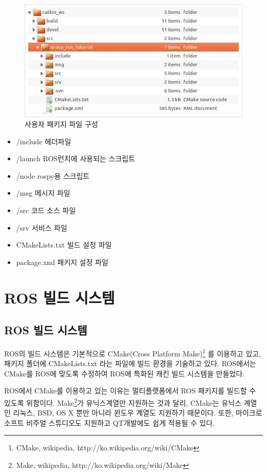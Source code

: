\begin{figure}[h]
\centering\includegraphics[width=0.5\columnwidth]{pictures/chapter4/folder_oroca_ros_tutorial.jpg}
\caption{사용자 패키지 파일 구성}
\end{figure}

\begin{itemize}
\item /include 헤더파일
\item /launch ROS런치에 사용되는 스크립트
\item /node rospy용 스크립트
\item /msg 메시지 파일
\item /src 코드 소스 파일
\item /srv 서비스 파일
\item CMakeLists.txt 빌드 설정 파일
\item package.xml 패키지 설정 파일
\end{itemize}

\section{ROS 빌드 시스템}
\label{sec:RosBuildSystem}

\subsection{ROS 빌드 시스템}

ROS의 빌드 시스템은 기본적으로 CMake(Cross Platform Make)\footnote{CMake, wikipedia, http://ko.wikipedia.org/wiki/CMake} 를 이용하고 있고, 패키지 폴더에 CMakeLists.txt 라는 파일에 빌드 환경을 기술하고 있다. ROS에서는 CMake를 ROS에 맞도록 수정하여 ROS에 특화된 캐킨 빌드 시스템을 만들었다. 

ROS에서 CMake를 이용하고 있는 이유는 멀티플랫폼에서 ROS 패키지를 빌드할 수 있도록 위함이다. Make\footnote{Make, wikipedia, http://ko.wikipedia.org/wiki/Make}가 유닉스계열만 지원하는 것과 달리, CMake는 유닉스 계열인 리눅스, BSD, OS X 뿐만 아니라 윈도우 계열도 지원하기 때문이다. 또한, 마이크로소프트 비주얼 스튜디오도 지원하고 QT개발에도 쉽게 적용될 수 있다. 


